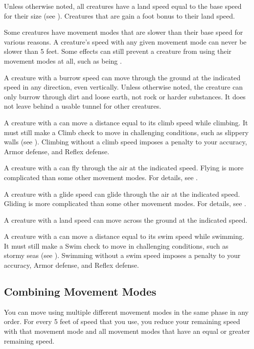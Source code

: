     Unless otherwise noted, all creatures have a land speed equal to the base speed for their size (see ).
    Creatures that are  gain a  foot bonus to their land speed.

    Some creatures have movement modes that are slower than their base speed for various reasons.
    A creature's speed with any given movement mode can never be slower than 5 feet.
    Some effects can still prevent a creature from using their movement modes at all, such as being \immobilized.

    A creature with a burrow speed can move through the ground at the indicated speed in any direction, even vertically.
    Unless otherwise noted, the creature can only burrow through dirt and loose earth, not rock or harder substances.
    It does not leave behind a usable tunnel for other creatures.

    A creature with a  can move a distance equal to its climb speed while climbing.
    It must still make a Climb check to move in challenging conditions, such as slippery walls (see ).
    Climbing without a climb speed imposes a  penalty to your accuracy, Armor defense, and Reflex defense.

    A creature with a  can fly through the air at the indicated speed.
    Flying is more complicated than some other movement modes.
    For details, see .

    A creature with a glide speed can glide through the air at the indicated speed.
    Gliding is more complicated than some other movement modes.
    For details, see .

    A creature with a land speed can move across the ground at the indicated speed.

    A creature with a  can move a distance equal to its swim speed while swimming.
    It must still make a Swim check to move in challenging conditions, such as stormy seas (see ).
    Swimming without a swim speed imposes a  penalty to your accuracy, Armor defense, and Reflex defense.

  \subsection{Combining Movement Modes}
    You can move using multiple different movement modes in the same phase in any order.
    For every 5 feet of speed that you use, you reduce your remaining speed with that movement mode and all movement modes that have an equal or greater remaining speed.

